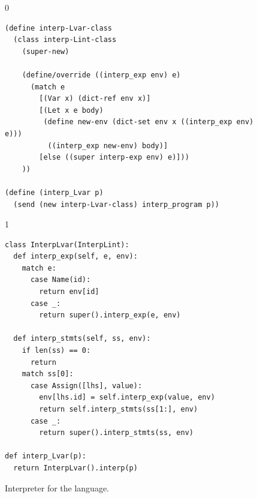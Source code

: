 \documentclass[7x10]{TimesAPriori_MIT}%
\def\racketEd{0}
\def\pythonEd{1}
\def\edition{0}
\numberwithin{theorem}{chapter}
\numberwithin{definition}{chapter}
\numberwithin{equation}{chapter}
\begin{document}
\begin{figure}[tp]
\begin{tcolorbox}[colback=white]
{\if\edition\racketEd
\begin{lstlisting}
(define interp-Lvar-class
  (class interp-Lint-class
    (super-new)
    
    (define/override ((interp_exp env) e)
      (match e
        [(Var x) (dict-ref env x)]
        [(Let x e body)
         (define new-env (dict-set env x ((interp_exp env) e)))
          ((interp_exp new-env) body)]
        [else ((super interp-exp env) e)]))
    ))

(define (interp_Lvar p)
  (send (new interp-Lvar-class) interp_program p))
\end{lstlisting}
\fi}
{\if\edition\pythonEd
\begin{lstlisting}
class InterpLvar(InterpLint):
  def interp_exp(self, e, env):
    match e:
      case Name(id):
        return env[id]
      case _:
        return super().interp_exp(e, env)

  def interp_stmts(self, ss, env):
    if len(ss) == 0:
      return
    match ss[0]:
      case Assign([lhs], value):
        env[lhs.id] = self.interp_exp(value, env)
        return self.interp_stmts(ss[1:], env)
      case _:
        return super().interp_stmts(ss, env)

def interp_Lvar(p):
  return InterpLvar().interp(p)
\end{lstlisting}
\fi}
\end{tcolorbox}
\caption{Interpreter for the \LangVar{} language.}
\label{fig:interp-Lvar}
\end{figure}
\end{document}
